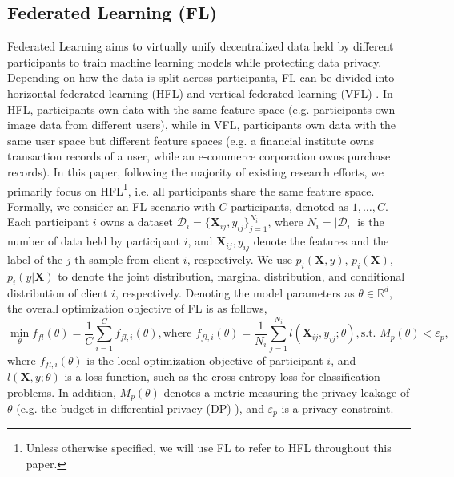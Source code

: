 \documentclass[11pt]{article}
\begin{document}
\subsection{Federated Learning (FL)}\label{sec:prelim-fl}
Federated Learning aims to virtually unify decentralized data held by different participants to train machine learning models while protecting data privacy. Depending on how the data is split across participants, FL can be divided into horizontal federated learning (HFL) and vertical federated learning (VFL) \cite{yang2019federated}. In HFL, participants own data with the same feature space (e.g. participants own image data from different users), while in VFL, participants own data with the same user space but different feature spaces (e.g. a financial institute owns transaction records of a user, while an e-commerce corporation owns purchase records). In this paper, following the majority of existing research efforts, we primarily focus on HFL\footnote{Unless otherwise specified, we will use FL to refer to HFL throughout this paper. }, i.e. all participants share the same feature space. Formally, we consider an FL scenario with $C$ participants, denoted as $1, \dots, C$. Each participant $i$ owns a dataset $\mathcal{D}_i=\{\mathbf{X}_{ij}, y_{ij}\}_{j=1}^{N_i}$, where $N_i=|\mathcal{D}_i|$ is the number of data held by participant $i$, and $\mathbf{X}_{ij}, y_{ij}$ denote the features and the label of the $j$-th sample from client $i$, respectively. We use $p_i(\mathbf{X}, y)$, $p_i(\mathbf{X})$, $p_i(y|\mathbf{X})$ to denote the joint distribution, marginal distribution, and conditional distribution of client $i$, respectively. Denoting the model parameters as $\theta\in \mathbb{R}^d$, the overall optimization objective of FL is as follows, 
\begin{equation}
    \min_{\theta} f_{fl}(\theta) = \frac{1}{C}\sum_{i=1}^C f_{fl, i}(\theta), \text{where } f_{fl, i}(\theta) =\frac{1}{N_i}\sum_{j=1}^{N_i}l\left(\mathbf{X}_{ij}, y_{ij};\theta\right), \text{s.t. } M_p(\theta)< \varepsilon_p,  
\label{eqn:fl}
\end{equation}
where $f_{fl, i}(\theta)$ is the local optimization objective of participant $i$, and $l(\mathbf{X}, y;\theta)$ is a loss function, such as the cross-entropy loss for classification problems. In addition, $M_p(\theta)$ denotes a metric measuring the privacy leakage of $\theta$ (e.g. the budget in differential privacy (DP) \cite{dwork2014algorithmic}), and $\varepsilon_p$ is a privacy constraint. 
\end{document}
